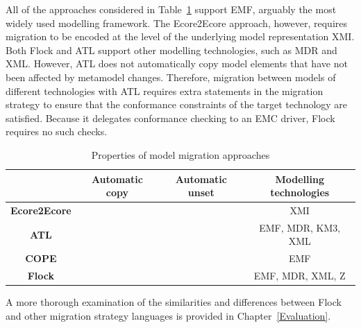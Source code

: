All of the approaches considered in Table~\ref{tab:differences} support EMF, arguably the most widely used modelling framework. The Ecore2Ecore approach, however, requires migration to be encoded at the level of the underlying model representation XMI. Both Flock and ATL support other modelling technologies, such as MDR and XML. However, ATL does not automatically copy model elements that have not been affected by metamodel changes. Therefore, migration between models of different technologies with ATL requires extra statements in the migration strategy to ensure that the conformance constraints of the target technology are satisfied. Because it delegates conformance checking to an EMC driver, Flock requires no such checks.

\begin{table}[b]
	\centering
	\begin{tabular}{|c|c|c|c|}
		\hline
		             & \textbf{Automatic copy} & \textbf{Automatic unset} & \textbf{Modelling technologies} \\
		\hline
		\textbf{Ecore2Ecore}  & \tick             & \cross              & XMI                    \\
		\hline
		\textbf{ATL}          & \cross            & \tick               & EMF, MDR, KM3, XML     \\
		\hline
		\textbf{COPE}         & \tick             & \cross              & EMF                    \\
		\hline
		\textbf{Flock}        & \tick             & \tick               & EMF, MDR, XML, Z       \\
		\hline
	\end{tabular}
	\label{tab:differences}
	\caption{Properties of model migration approaches}
\end{table}

A more thorough examination of the similarities and differences between Flock and other migration strategy languages is provided in Chapter~\ref{Evaluation}.
